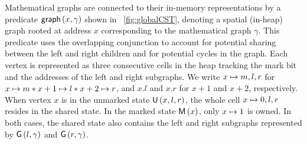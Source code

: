 Mathematical graphs are connected to their in-memory representations
by a predicate $\textsf{graph}\left(x, \gamma\right)$ shown in \fig~\ref{fig:globalCST}, denoting a spatial
(in-heap) graph rooted at address $x$ corresponding to the
mathematical graph $\gamma$. This predicate uses the overlapping conjunction to account
for potential sharing between the left and right children and for potential
cycles in the graph.
%
Each vertex is represented as three consecutive cells in the heap
tracking the mark bit and the addresses of the left and right
subgraphs. We write $x \mapsto m, l, r$ for $x \mapsto m *
x+1 \mapsto l * x+2 \mapsto r$, and $x.l$ and $x.r$ for $x+1$ and
$x+2$, respectively. When vertex $x$ is in the unmarked state
$\textsf{U}\left(x, l, r\right)$, the whole cell $x \mapsto 0,l,r$ resides in the
shared state. In the marked state $\textsf{M}\left(x\right)$, only $x \mapsto 1$ is
owned. In both cases, the shared state also contains the left and
right subgraphs represented by $\textsf{G}\left(l, \gamma\right)$ and $\textsf{G}\left(r, \gamma\right)$.

